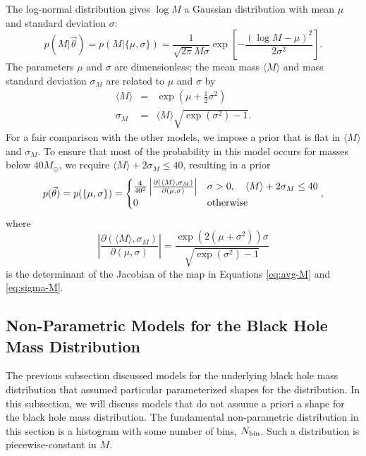 \documentclass[preprint]{aastex}
\newcommand{\Msun}{M_\odot}
\newcommand{\Nbin}{N_{\textnormal{bin}}}
\newcommand{\vtheta}{\vec{\theta}}
\begin{document}
The log-normal distribution gives $\log M$ a Gaussian distribution
with mean $\mu$ and standard deviation $\sigma$:
\begin{equation}
  \label{eq:log-normal-def}
  p(M|\vtheta) = p(M|\{\mu, \sigma \}) = \frac{1}{
    \sqrt{2\pi} M \sigma} \exp\left[ -\frac{\left(\log M - \mu\right)^2}{2 \sigma^2} \right].
\end{equation}
The parameters $\mu$ and $\sigma$ are dimensionless; the mean mass
$\langle M \rangle$ and mass standard deviation $\sigma_M$ are related
to $\mu$ and $\sigma$ by
\begin{eqnarray}
  \label{eq:avg-M}
  \langle M \rangle & = & \exp\left( \mu + \frac{1}{2} \sigma^2
  \right) \\
  \label{eq:sigma-M}
  \sigma_M & = & \langle M \rangle \sqrt{\exp\left( \sigma^2 \right) - 1}.
\end{eqnarray}
For a fair comparison with the other models, we impose a prior that is
flat in $\langle M \rangle$ and $\sigma_M$.  To ensure that most of
the probability in this model occurs for masses below $40 \Msun$, we
require $\langle M \rangle + 2 \sigma_M \leq 40$, resulting in a
prior
\begin{equation}
  p(\vtheta) = p(\{\mu,\sigma\}) = 
  \begin{cases}
    \frac{4}{40^2} \left| \frac{\partial \left(\langle M \rangle,
          \sigma_M \right)}{\partial \left( \mu, \sigma \right)}
    \right| & \sigma > 0, \quad \langle M \rangle + 2 \sigma_M \leq 40
    \\
    0 & \textnormal{otherwise}
  \end{cases},
\end{equation}
where 
\begin{equation}
  \left| \frac{\partial \left(\langle M \rangle,
          \sigma_M \right)}{\partial \left( \mu, \sigma \right)}
    \right| = \frac{\exp\left( 2 \left( \mu + \sigma^2 \right)\right)
      \sigma}{\sqrt{\exp\left( \sigma^2 \right) - 1}}
\end{equation}
is the determinant of the Jacobian of the map in Equations
\eqref{eq:avg-M} and \eqref{eq:sigma-M}.

\subsection{Non-Parametric Models for the Black Hole Mass Distribution}
\label{sec:non-parametric-models}

The previous subsection discussed models for the underlying black hole
mass distribution that assumed particular parameterized shapes for the
distribution.  In this subsection, we will discuss models that do not
assume a priori a shape for the black hole mass distribution.  The
fundamental non-parametric distribution in this section is a
histogram with some number of bins, $\Nbin$.  Such a distribution is
piecewise-constant in $M$.
\end{document}
